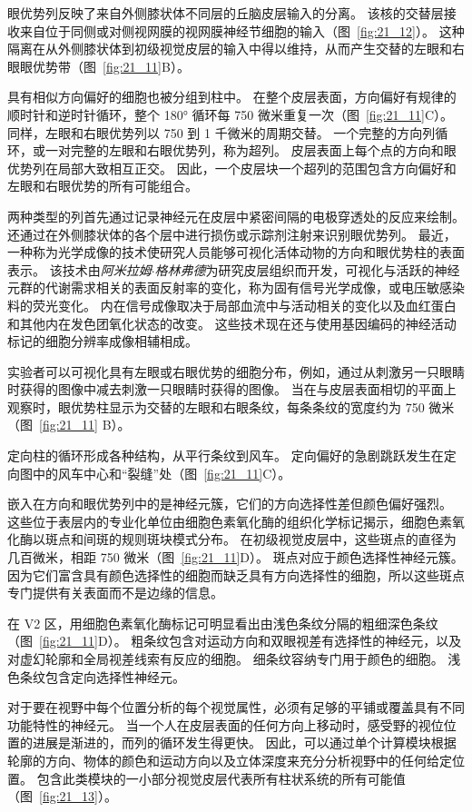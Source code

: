 眼优势列反映了来自外侧膝状体不同层的丘脑皮层输入的分离。
该核的交替层接收来自位于同侧或对侧视网膜的视网膜神经节细胞的输入（图~\ref{fig:21_12}）。
这种隔离在从外侧膝状体到初级视觉皮层的输入中得以维持，从而产生交替的左眼和右眼眼优势带（图~\ref{fig:21_11}B）。


具有相似方向偏好的细胞也被分组到柱中。
在整个皮层表面，方向偏好有规律的顺时针和逆时针循环，整个 180° 循环每 750 微米重复一次（图~\ref{fig:21_11}C）。
同样，左眼和右眼优势列以 750 到 1 千微米的周期交替。
一个完整的方向列循环，或一对完整的左眼和右眼优势列，称为超列。
皮层表面上每个点的方向和眼优势列在局部大致相互正交。
因此，一个皮层块一个超列的范围包含方向偏好和左眼和右眼优势的所有可能组合。


两种类型的列首先通过记录神经元在皮层中紧密间隔的电极穿透处的反应来绘制。
还通过在外侧膝状体的各个层中进行损伤或示踪剂注射来识别眼优势列。
最近，一种称为光学成像的技术使研究人员能够可视化活体动物的方向和眼优势柱的表面表示。 
该技术由\textit{阿米拉姆$\cdot$格林弗德}为研究皮层组织而开发，可视化与活跃的神经元群的代谢需求相关的表面反射率的变化，称为固有信号光学成像，或电压敏感染料的荧光变化。 
内在信号成像取决于局部血流中与活动相关的变化以及血红蛋白和其他内在发色团氧化状态的改变。 
这些技术现在还与使用基因编码的神经活动标记的细胞分辨率成像相辅相成。


实验者可以可视化具有左眼或右眼优势的细胞分布，例如，通过从刺激另一只眼睛时获得的图像中减去刺激一只眼睛时获得的图像。 
当在与皮层表面相切的平面上观察时，眼优势柱显示为交替的左眼和右眼条纹，每条条纹的宽度约为 750 微米（图~\ref{fig:21_11} B）。


定向柱的循环形成各种结构，从平行条纹到风车。 
定向偏好的急剧跳跃发生在定向图中的风车中心和“裂缝”处（图~\ref{fig:21_11}C）。


嵌入在方向和眼优势列中的是神经元簇，它们的方向选择性差但颜色偏好强烈。
这些位于表层内的专业化单位由细胞色素氧化酶的组织化学标记揭示，细胞色素氧化酶以斑点和间斑的规则斑块模式分布。
在初级视觉皮层中，这些斑点的直径为几百微米，相距 750 微米（图~\ref{fig:21_11}D）。
斑点对应于颜色选择性神经元簇。
因为它们富含具有颜色选择性的细胞而缺乏具有方向选择性的细胞，所以这些斑点专门提供有关表面而不是边缘的信息。


在 V2 区，用细胞色素氧化酶标记可明显看出由浅色条纹分隔的粗细深色条纹（图~\ref{fig:21_11}D）。
粗条纹包含对运动方向和双眼视差有选择性的神经元，以及对虚幻轮廓和全局视差线索有反应的细胞。
细条纹容纳专门用于颜色的细胞。
浅色条纹包含定向选择性神经元。


对于要在视野中每个位置分析的每个视觉属性，必须有足够的平铺或覆盖具有不同功能特性的神经元。
当一个人在皮层表面的任何方向上移动时，感受野的视位位置的进展是渐进的，而列的循环发生得更快。
因此，可以通过单个计算模块根据轮廓的方向、物体的颜色和运动方向以及立体深度来充分分析视野中的任何给定位置。
包含此类模块的一小部分视觉皮层代表所有柱状系统的所有可能值（图~\ref{fig:21_13}）。


